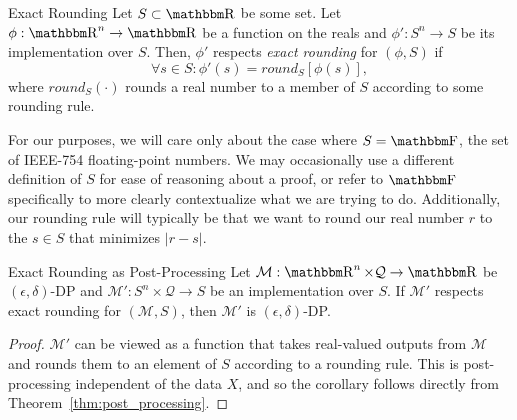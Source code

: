 \documentclass[11pt]{scrartcl} %
\begin{document}
\begin{definition}
	\label{defn:exact_rounding}
	Exact Rounding \newline
	Let $S \subset \R$ be some set.
	Let $\phi: \R^n \rightarrow \R$ be a function on the reals and $\phi': S^n \rightarrow S$ be its implementation over $S$.
	Then, $\phi'$ respects \emph{exact rounding} for $(\phi, S)$ if
	\[ \forall s \in S: \phi'(s) = round_{S}[\phi(s)], \]
	where $round_{S}(\cdot)$ rounds a real number to a member of $S$ according to some rounding rule.
\end{definition}
For our purposes, we will care only about the case where $S = \F$, the set of IEEE-754 floating-point numbers.
We may occasionally use a different definition of $S$ for ease of reasoning about a proof, or refer to $\F$
specifically to more clearly contextualize what we are trying to do.
Additionally, our rounding rule will typically be that we want to round our real number $r$ to the $s \in S$ that minimizes
$\vert r-s \vert$.

\begin{corollary}
	\label{cor:exact_rounding_post_processing}
	Exact Rounding as Post-Processing \newline
	Let $\mathcal{M}: \R^n \times \mathcal{Q} \rightarrow \R$ be
	$(\epsilon, \delta)$-DP and $\mathcal{M}': S^n \times \mathcal{Q} \rightarrow S$
	be an implementation over $S$. If $\mathcal{M}'$ respects exact rounding for
	$(\mathcal{M}, S)$, then $\mathcal{M}'$ is $(\epsilon, \delta)$-DP.

	\begin{proof}
		$\mathcal{M}'$ can be viewed as a function that takes real-valued outputs
		from $\mathcal{M}$ and rounds them to an element of $S$ according to a rounding rule.
		This is post-processing independent of the data $X$, and so the corollary follows
		directly from Theorem~\ref{thm:post_processing}.
	\end{proof}
\end{corollary}
\end{document}
